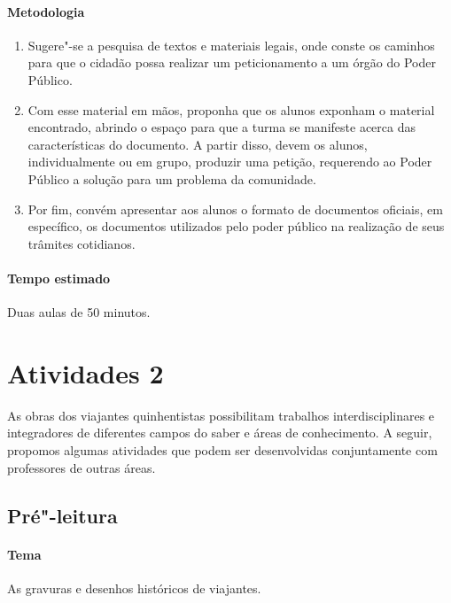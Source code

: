 \documentclass[12pt]{extarticle}
\begin{document}
\paragraph{Metodologia}
\begin{enumerate}

\item Sugere"-se a pesquisa de textos e materiais legais, onde conste os caminhos para
que o cidadão possa realizar um peticionamento a um órgão do Poder
Público. 

\item Com esse material em mãos, proponha que os alunos exponham o
material encontrado, abrindo o espaço para que a turma se manifeste
acerca das características do documento. A partir disso, devem os
alunos, individualmente ou em grupo, produzir uma petição, requerendo ao
Poder Público a solução para um problema da comunidade.

\item Por fim, convém apresentar aos alunos o formato de
documentos oficiais, em específico, os documentos utilizados pelo poder
público na realização de seus trâmites cotidianos.

\end{enumerate}

\paragraph{Tempo estimado} Duas aulas de 50 minutos.



\section{Atividades 2}

As obras dos viajantes quinhentistas possibilitam trabalhos
interdisciplinares e integradores de diferentes campos do saber e áreas
de conhecimento. A seguir, propomos algumas atividades que podem ser
desenvolvidas conjuntamente com professores de outras áreas.


\subsection{Pré"-leitura}

\paragraph{Tema} As gravuras e desenhos históricos de viajantes.
\end{document}
